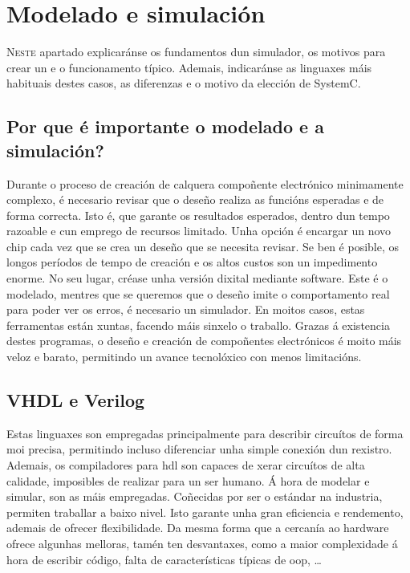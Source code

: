 \chapter{Modelado e simulación}
\label{chap:mod_sim}

\lettrine{N}{este} apartado explicaránse os fundamentos dun simulador, os motivos para crear un e o funcionamento típico. Ademais, indicaránse as linguaxes máis habituais destes casos, as diferenzas e o motivo da elección de SystemC. 

\section{Por que é importante o modelado e a simulación?}\label{sec:mod_sim}
Durante o proceso de creación de calquera compoñente electrónico minimamente complexo, é necesario revisar que o deseño realiza as funcións esperadas e de forma correcta. Isto é, que garante os resultados esperados, dentro dun tempo razoable e cun emprego de recursos limitado. Unha opción é encargar un novo chip cada vez que se crea un deseño que se necesita revisar. Se ben é posible, os longos períodos de tempo de creación e os altos custos son un impedimento enorme. No seu lugar, créase unha versión dixital mediante \gls{software}. Este é o modelado, mentres que se queremos que o deseño imite o comportamento real para poder ver os erros, é necesario un simulador. En moitos casos, estas ferramentas están xuntas, facendo máis sinxelo o traballo.
Grazas á existencia destes programas, o deseño e creación de compoñentes electrónicos é moito máis veloz e barato, permitindo un avance tecnolóxico con menos limitacións.


\section{VHDL e Verilog}\label{sec:vhdl_verilog}
Estas linguaxes son empregadas principalmente para describir circuítos de forma moi precisa, permitindo incluso diferenciar unha simple conexión dun rexistro. Ademais, os compiladores para \acrfull{hdl} son capaces de xerar circuítos de alta calidade, imposibles de realizar para un ser humano. Á hora de modelar e simular, son as máis empregadas. Coñecidas por ser o estándar na industria, permiten traballar a baixo nivel. Isto garante unha gran eficiencia e rendemento, ademais de ofrecer flexibilidade. Da mesma forma que a cercanía ao hardware ofrece algunhas melloras, tamén ten desvantaxes, como a maior complexidade á hora de escribir código, falta de características típicas de \acrfull{oop}, \dots

